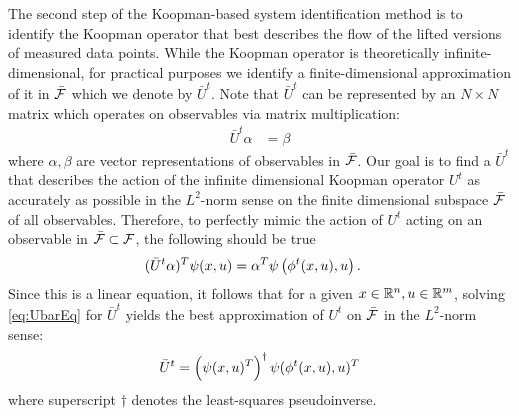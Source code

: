The second step of the Koopman-based system identification method is to identify the Koopman operator that best describes the flow of the lifted versions of measured data points.
While the Koopman operator is theoretically infinite-dimensional, for practical purposes we identify a finite-dimensional approximation of it in $\bar{\mathcal{F}}$ which we denote by $\bar{U}^t$.
Note that $\bar{U}^t$ can be represented by an $N \times N$ matrix which operates on observables via matrix multiplication:
\begin{align}
    \bar{U}^t {\alpha} &= {\beta} 
    \label{eq:Ubar}
\end{align}
where $\alpha, \beta$ are vector representations of observables in $\bar{\mathcal{F}}$.
Our goal is to find a $\bar{U}^t$ that describes the action of the infinite dimensional Koopman operator $U^t$ as accurately as possible in the $L^2$-norm sense on the finite dimensional subspace $\bar{\mathcal{F}}$  of all observables.
Therefore, to perfectly mimic the action of $U^t$ acting on an observable in $\bar{\mathcal{F}} \subset \mathcal{F}$, the following should be true
\begin{align}
    ( \bar{U}^t {\alpha} )^T {\psi}(x, u) &=
    {\alpha}^T {\psi} \left( \phi^t(x,u), u \right).
    \label{eq:UbarEq}
\end{align}
Since this is a linear equation, it follows that for a given ${x \in \mathbb{R}^n, u \in \mathbb{R}^m}$, solving \eqref{eq:UbarEq} for $\bar{U}^t$ yields the best approximation of $U^t$ on $\bar{\mathcal{F}}$ in the $L^2$-norm sense:
\begin{align}
    \bar{U}^t = \left( {\psi}(x, u)^T \right)^\dagger {\psi}( \phi^t(x,u), u )^T
    \label{eq:Uapprox}
\end{align}
where superscript $\dagger$ denotes the least-squares pseudoinverse.

